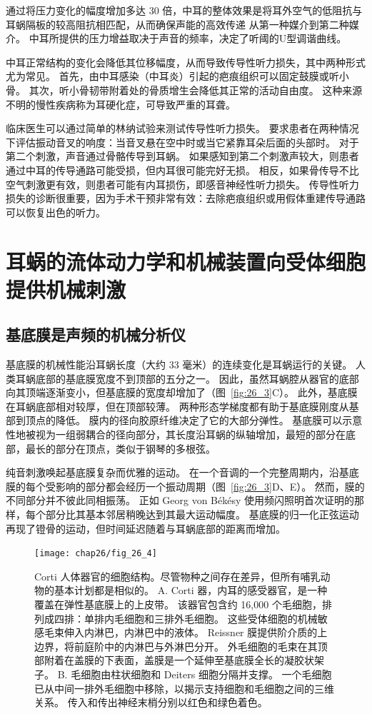 通过将压力变化的幅度增加多达 30 倍，中耳的整体效果是将耳外空气的低阻抗与耳蜗隔板的较高阻抗相匹配，从而确保声能的高效传递 从第一种媒介到第二种媒介。
中耳所提供的压力增益取决于声音的频率，决定了听阈的U型调谐曲线。


中耳正常结构的变化会降低其位移幅度，从而导致传导性听力损失，其中两种形式尤为常见。
首先，由中耳感染（中耳炎）引起的疤痕组织可以固定鼓膜或听小骨。
其次，听小骨韧带附着处的骨质增生会降低其正常的活动自由度。
这种来源不明的慢性疾病称为耳硬化症，可导致严重的耳聋。


临床医生可以通过简单的林纳试验来测试传导性听力损失。
要求患者在两种情况下评估振动音叉的响度：当音叉悬在空中时或当它紧靠耳朵后面的头部时。
对于第二个刺激，声音通过骨骼传导到耳蜗。
如果感知到第二个刺激声较大，则患者通过中耳的传导通路可能受损，但内耳很可能完好无损。
相反，如果骨传导不比空气刺激更有效，则患者可能有内耳损伤，即感音神经性听力损失。
传导性听力损失的诊断很重要，因为手术干预非常有效：去除疤痕组织或用假体重建传导通路可以恢复出色的听力。



\section{耳蜗的流体动力学和机械装置向受体细胞提供机械刺激}

\subsection{基底膜是声频的机械分析仪}

基底膜的机械性能沿耳蜗长度（大约 33 毫米）的连续变化是耳蜗运行的关键。
人类耳蜗底部的基底膜宽度不到顶部的五分之一。
因此，虽然耳蜗腔从器官的底部向其顶端逐渐变小，但基底膜的宽度却增加了（图~\ref{fig:26_3}C）。
此外，基底膜在耳蜗底部相对较厚，但在顶部较薄。
两种形态学梯度都有助于基底膜刚度从基部到顶点的降低。
膜内的径向胶原纤维决定了它的大部分弹性。
基底膜可以示意性地被视为一组弱耦合的径向部分，其长度沿耳蜗的纵轴增加，最短的部分在底部，最长的部分在顶点，类似于钢琴的多根弦。


纯音刺激唤起基底膜复杂而优雅的运动。
在一个音调的一个完整周期内，沿基底膜的每个受影响的部分都会经历一个振动周期（图~\ref{fig:26_3}D、E）。
然而，膜的不同部分并不彼此同相振荡。
正如 Georg von Békésy 使用频闪照明首次证明的那样，每个部分比其基本邻居稍晚达到其最大运动幅度。
基底膜的归一化正弦运动再现了镫骨的运动，但时间延迟随着与耳蜗底部的距离而增加。


\begin{figure}[htbp]
	\centering
	\texttt{[image: chap26/fig\_26\_4]}
	\caption{Corti 人体器官的细胞结构。尽管物种之间存在差异，但所有哺乳动物的基本计划都是相似的。
		A. Corti 器，内耳的感受器官，是一种覆盖在弹性基底膜上的上皮带。
		该器官包含约 16,000 个毛细胞，排列成四排：单排内毛细胞和三排外毛细胞。
		这些受体细胞的机械敏感毛束伸入内淋巴，内淋巴中的液体。
		Reissner 膜提供阶介质的上边界，将前庭阶中的内淋巴与外淋巴分开。
		外毛细胞的毛束在其顶部附着在盖膜的下表面，盖膜是一个延伸至基底膜全长的凝胶状架子。
		B. 毛细胞由柱状细胞和 Deiters 细胞分隔并支撑。
		一个毛细胞已从中间一排外毛细胞中移除，以揭示支持细胞和毛细胞之间的三维关系。
		传入和传出神经末梢分别以红色和绿色着色。}
	\label{fig:26_4}
\end{figure}


